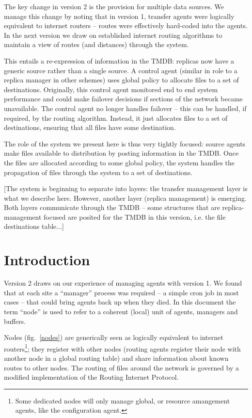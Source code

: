 \documentclass{cmspaper}
\begin{document}
The key change in version 2 is the provision for multiple data sources. We manage this change by noting that in version 1, transfer agents were logically equivalent to internet routers -- routes were effectively hard-coded into the agents.  In the next version we draw on established internet routing algorithms to maintain a view of routes (and distances) through the system.

This entails a re-expression of information in the TMDB: replicas now have a generic source rather than a single source.  A control agent (similar in role to a replica manager in other schemes) uses global policy to allocate files to a set of destinations.  Originally, this control agent monitored end to end system performance and could make failover decisions if sections of the network became unavailable.  The control agent no longer handles failover -- this can be handled, if required, by the routing algorithm.  Instead, it just allocates files to a set of destinations, ensuring that all files have some destination.

The role of the system we present here is thus very tightly focused: source agents make files available to distribution by posting information in the TMDB.  Once the files are allocated according to some global policy, the system handles the propagation of files through the system to a set of destinations.

[The system is beginning to separate into layers: the transfer management layer is what we describe here. However, another layer (replica management) is emerging.  Both layers communicate through the TMDB -- some structures that are replica-management focused are posited for the TMDB in this version, i.e. the file destinations table...] 

\section{Introduction}
Version 2 draws on our experience of managing agents with version 1.  We found that at each site a ``manager'' process was required -- a simple cron job in most cases -- that could bring agents back up when they died.  In this document the term ``node'' is used to refer to a coherent (local) unit of agents, managers and buffers.

Nodes (fig.~\ref{nodes}) are generically seen as logically equivalent to internet routers\footnote{Some dedicated nodes will only manage global, or resource amangement agents, like the configuration agent.}; they register with other nodes (routing agents register their node with another node in a global routing table) and share information about known routes to other nodes.  The routing of files around the network is governed by a modified implementation of the Routing Internet Protocol.
\end{document}

